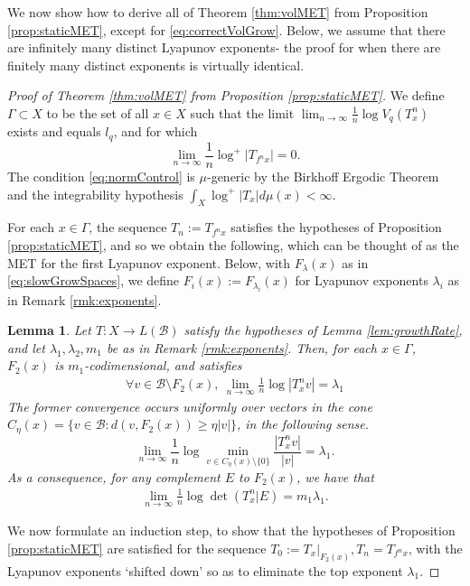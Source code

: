 \documentclass[11pt]{amsart}
\theoremstyle{theorem}
\newtheorem{lem}[thm]{Lemma}
\theoremstyle{definition}
\numberwithin{equation}{section}
\renewcommand{\l}{\lambda}
\newcommand{\Bc}{\mathcal{B}}
\begin{document}
We now show how to derive all of Theorem \ref{thm:volMET} from Proposition \ref{prop:staticMET}, except for \eqref{eq:correctVolGrow}. Below, we assume that there are infinitely many distinct Lyapunov exponents- the proof for when there are finitely many distinct exponents is virtually identical.

\begin{proof}[Proof of Theorem \ref{thm:volMET} from Proposition \ref{prop:staticMET}]
We define $\Gamma \subset X$ to be the set of all $x \in X$ such that the limit $\lim_{n \to \infty} \frac{1}{n} \log V_q(T^n_x)$ exists and equals $l_q$, and for which 
\begin{equation} \label{eq:normControl}
\lim_{n \to \infty} \frac{1}{n} \log^+ |T_{f^n x}| = 0.
\end{equation}
The condition \eqref{eq:normControl} is $\mu$-generic by the Birkhoff Ergodic Theorem and the integrability hypothesis $\int_X \log^+ |T_x| d \mu(x) < \infty$.

For each $x \in \Gamma$, the sequence $T_n := T_{f^n x}$ satisfies the hypotheses of Proposition \ref{prop:staticMET}, and so we obtain the following, which can be thought of as the MET for the first Lyapunov exponent. Below, with $F_{\l}(x)$ as in \eqref{eq:slowGrowSpaces}, we define $F_i(x) := F_{\l_i}(x)$ for Lyapunov exponents $\l_i$ as in Remark \ref{rmk:exponents}.

\begin{lem}\label{lem:firstSubMET}
Let $T : X \to L(\Bc)$ satisfy the hypotheses of Lemma \ref{lem:growthRate}, and let $\l_1, \l_2, m_1$ be as in Remark \ref{rmk:exponents}. Then, for each $x \in \Gamma$, $F_2(x)$ is $m_1$-codimensional, and satisfies
\begin{gather*}
\forall v \in \Bc \setminus F_2(x),~  \lim_{n \to \infty} \frac{1}{n} \log |T^n_x v| = \l_1
\end{gather*}
The former convergence occurs uniformly over vectors in the cone $C_{\eta}(x)= \{v \in \Bc : d(v, F_2(x)) \geq \eta |v| \}$, in the following sense.
\[
\lim_{n \to \infty} \frac{1}{n} \log \min_{v \in C_{\eta}(x) \setminus \{0\}} \frac{|T^n_x v|}{|v|} = \l_1.
\]
As a consequence, for any complement $E$ to $F_2(x)$, we have that
\begin{align}\label{eq:firstSubVolGrow2}
\lim_{n \to \infty} \frac{1}{n} \log \det(T^n_x | E) = m_1 \l_1.
\end{align}
\end{lem}

We now formulate an induction step, to show that the hypotheses of Proposition \ref{prop:staticMET} are satisfied for the sequence $T_0 := T_x|_{F_2(x)}, T_n = T_{f^{n} x}$, with the Lyapunov exponents `shifted down' so as to eliminate the top exponent $\l_1$.


\end{proof}
\end{document}
